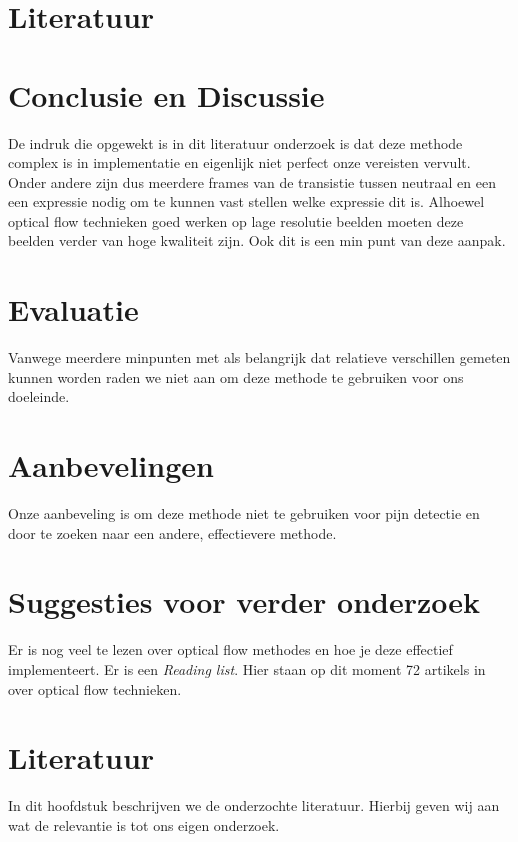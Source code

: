 \documentclass[11pt]{article}
\begin{document}
    \section{Literatuur}\label{sec:literatuur}


    
    \section{Conclusie en Discussie}\label{sec:conclusie-en-discussie}
    De indruk die opgewekt is in dit literatuur onderzoek is dat deze methode complex is in implementatie en eigenlijk niet perfect onze vereisten vervult.
    Onder andere zijn dus meerdere frames van de transistie tussen neutraal en een een expressie nodig om te kunnen vast stellen welke expressie dit is.
    Alhoewel optical flow technieken goed werken op lage resolutie beelden moeten deze beelden verder van hoge kwaliteit zijn.
    Ook dit is een min punt van deze aanpak.


    \section{Evaluatie}\label{sec:evaluatie2}
    Vanwege meerdere minpunten met als belangrijk dat relatieve verschillen gemeten kunnen worden raden we niet aan om deze methode te gebruiken voor ons doeleinde.


    \section{Aanbevelingen}\label{sec:aanbevelingen2}
    Onze aanbeveling is om deze methode niet te gebruiken voor pijn detectie en door te zoeken naar een andere, effectievere methode.


    \section{Suggesties voor verder onderzoek}\label{sec:suggesties-voor-verder-onderzoek2}
    Er is nog veel te lezen over optical flow methodes en hoe je deze effectief implementeert.
    Er is een \emph{\citet{Readinglist} Reading list}.
    Hier staan op dit moment 72 artikels in over optical flow technieken.


    \section{Literatuur}\label{sec:literatuur2}
    In dit hoofdstuk beschrijven we de onderzochte literatuur.
    Hierbij geven wij aan wat de relevantie is tot ons eigen onderzoek.
\end{document}
